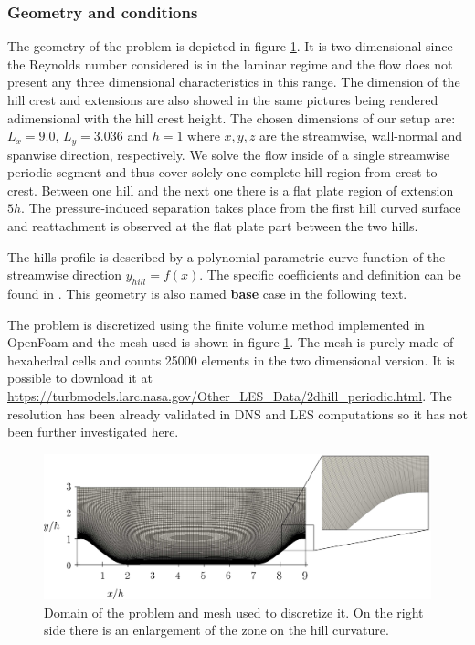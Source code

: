 \subsubsection{Geometry and conditions}
The geometry of the problem is depicted in figure \ref{fig:mesh_hill}. It is two dimensional since the Reynolds number considered is in the laminar regime and the flow does not present any three dimensional characteristics in this range. The dimension of the hill crest and extensions are also showed in the same pictures being rendered adimensional with the hill crest height. The chosen dimensions of our setup are: $L_x = 9.0$, $L_y = 3.036$ and $h = 1$ where $x,y,z$ are the streamwise, wall-normal and spanwise direction, respectively. We solve the flow inside of a single streamwise periodic segment and thus cover solely one complete hill region from crest to crest.
Between one hill and the next one there is a flat plate region of extension $5h$. The pressure-induced separation takes place from the first hill curved surface and reattachment is observed at the flat plate part between the two hills.

The hills profile is described by a polynomial parametric curve function of the streamwise direction $y_{hill} = f(x)$. The specific coefficients and definition can be found in \citet{almeida1993wake}. This geometry is also named \textbf{base} case in the following text.

The problem is discretized using the finite volume method implemented in OpenFoam and the mesh used is shown in figure \ref{fig:mesh_hill}. The mesh is purely made of hexahedral cells and counts 25000 elements in the two dimensional version. It is possible to download it at \url{https://turbmodels.larc.nasa.gov/Other_LES_Data/2dhill_periodic.html}. The resolution has been already validated in DNS and LES computations so it has not been further investigated here.

\begin{figure}[h]
	\centering
	\includegraphics[width=1\linewidth]{chapter_5/figure/mesh}
	\caption{Domain of the problem and mesh used to discretize it. On the right side there is an enlargement of the zone on the hill curvature.}
	\label{fig:mesh_hill}
\end{figure}

